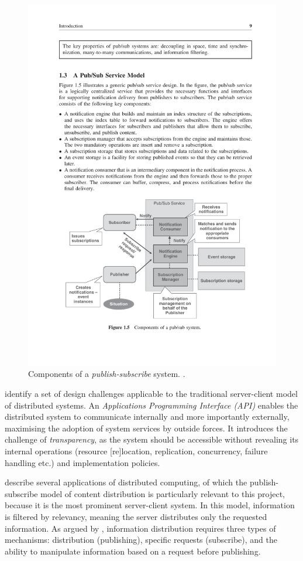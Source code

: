 \documentclass[../report.tex]{subfiles}
\begin{document}
\begin{figure}
\centering
\includegraphics[width=0.8\linewidth]{figures/pubsubsystem.pdf}
\caption{Components of a \textit{publish-subscribe} system. \cite[p. 9]{tarkoma2012publish}.}
\label{fig:pubsubsystem}
\end{figure}

\cite{kshemkalyani2011distributed} identify a set of design challenges applicable to the traditional server-client model of distributed systems. An \textit{Applications Programming Interface (API)} enables the distributed system to communicate internally and more importantly externally, maximising the adoption of system services by outside forces. It introduces the challenge of \textit{transparency}, as the system should be accessible without revealing its internal operations (resource [re]location, replication, concurrency, failure handling etc.) and implementation policies.

\cite{kshemkalyani2011distributed} describe several applications of distributed computing, of which the publish-subscribe model of content distribution is particularly relevant to this project, because it is the most prominent server-client system. In this model, information is filtered by relevancy, meaning the server distributes only the requested information. As argued by \cite{kshemkalyani2011distributed}, information distribution requires three types of mechanisms: distribution (publishing), specific requests (subscribe), and the ability to manipulate information based on a request before publishing. \\
\end{document}
